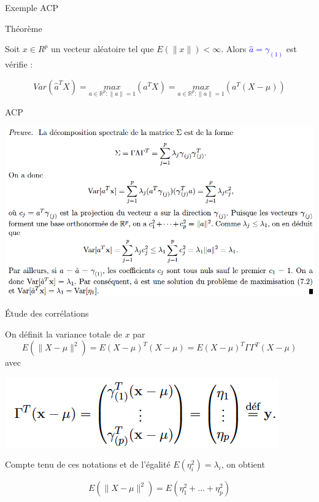 \documentclass[11pt]{beamer}
\begin{document}
\begin{frame}{ Exemple ACP }

\begin{block}{Théorème}

Soit $x \in R^p$ un vecteur aléatoire tel que $E(\parallel  x \parallel) < \infty$. Alors  \textcolor{blue}{$\hat{a}= \gamma_{(1)}$} est
vérifie : 

 $$ Var(\hat{a}^TX)=\underset{a \in \mathbb{R}^p : \parallel a \parallel=1}{max} (a^TX)=\underset{a \in \mathbb{R}^p : \parallel a \parallel=1}{max} (a^T(X-\mu)) $$ 
 
\end{block}

\end{frame}



\begin{frame}{ACP }

\includegraphics[scale=0.37]{Thee.png}

\end{frame}


\begin{frame}{Étude des corrélations }

 On définit la variance totale de $x$ par $$ E(\parallel  X-\mu\parallel^2)=E(X-\mu)^T(X-\mu)=E(X-\mu)^T\Gamma\Gamma^T (X-\mu)$$ avec 
 
 \centering 
 \includegraphics[scale=0.5]{Gamma.png}
 
 Compte tenu de ces notations et de l’égalité 
 $E(\eta_i^2) = \lambda_i$, on obtient 
 
$$ E(\parallel  X-\mu\parallel^2)=E(\eta_1^2+\ldots +\eta_p^2)$$ 

\end{frame}
\end{document}
